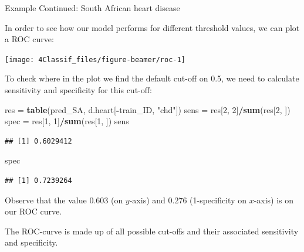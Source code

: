\documentclass[10pt,ignorenonframetext,]{beamer}
\newenvironment{Shaded}{\begin{snugshade}}{\end{snugshade}}
\newcommand{\KeywordTok}[1]{\textcolor[rgb]{0.13,0.29,0.53}{\textbf{#1}}}
\newcommand{\DecValTok}[1]{\textcolor[rgb]{0.00,0.00,0.81}{#1}}
\newcommand{\StringTok}[1]{\textcolor[rgb]{0.31,0.60,0.02}{#1}}
\newcommand{\OperatorTok}[1]{\textcolor[rgb]{0.81,0.36,0.00}{\textbf{#1}}}
\newcommand{\NormalTok}[1]{#1}
\begin{document}
\begin{frame}

\begin{block}{Example Continued: South African heart disease}

In order to see how our model performs for different threshold values,
we can plot a ROC curve:

\scriptsize

\begin{center}\texttt{[image: 4Classif\_files/figure-beamer/roc-1]} \end{center}

\end{block}

\end{frame}

\begin{frame}[fragile]

To check where in the plot we find the default cut-off on 0.5, we need
to calculate sensitivity and specificity for this cut-off:

\scriptsize

\begin{Shaded}
\begin{Highlighting}[]
\NormalTok{res =}\StringTok{ }\KeywordTok{table}\NormalTok{(pred_SA, d.heart[}\OperatorTok{-}\NormalTok{train_ID, }\StringTok{"chd"}\NormalTok{])}
\NormalTok{sens =}\StringTok{ }\NormalTok{res[}\DecValTok{2}\NormalTok{, }\DecValTok{2}\NormalTok{]}\OperatorTok{/}\KeywordTok{sum}\NormalTok{(res[}\DecValTok{2}\NormalTok{, ])}
\NormalTok{spec =}\StringTok{ }\NormalTok{res[}\DecValTok{1}\NormalTok{, }\DecValTok{1}\NormalTok{]}\OperatorTok{/}\KeywordTok{sum}\NormalTok{(res[}\DecValTok{1}\NormalTok{, ])}
\NormalTok{sens}
\end{Highlighting}
\end{Shaded}

\begin{verbatim}
## [1] 0.6029412
\end{verbatim}

\begin{Shaded}
\begin{Highlighting}[]
\NormalTok{spec}
\end{Highlighting}
\end{Shaded}

\begin{verbatim}
## [1] 0.7239264
\end{verbatim}

\normalsize
Observe that the value 0.603 (on \(y\)-axis) and 0.276 (1-specificity on
\(x\)-axis) is on our ROC curve.

The ROC-curve is made up of all possible cut-offs and their associated
sensitivity and specificity.

\end{frame}
\end{document}
